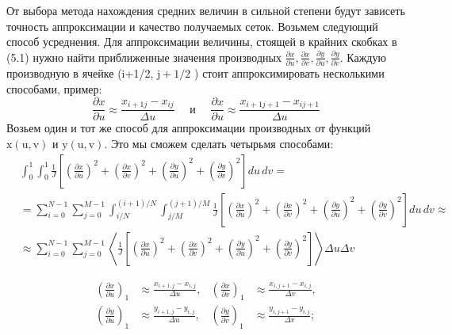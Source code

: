 \documentclass[a4paper,14pt,russian]{extreport}
\renewcommand{\_}{\kern-1.5pt\textunderscore\kern-1.5pt}
\begin{document}
От выбора метода нахождения средних величин в сильной степени будут зависеть точность аппроксимации и качество получаемых сеток. Возьмем следующий способ усреднения. Для аппроксимации величины, стоящей в крайних скобках в (5.1) нужно найти приближенные значения производных $\frac{\partial x}{\partial u}, \frac{\partial x}{\partial v}, \frac{\partial y}{\partial u}, \frac{\partial y}{\partial v}$. Каждую производную в ячейке (i+1/2, $\mathrm{j}+1 / 2$ ) стоит аппроксимировать несколькими способами, пример:
$$
\frac{\partial x}{\partial u} \approx \frac{x_{i+1 j}-x_{i j}}{\Delta u} \quad \text { и } \quad \frac{\partial x}{\partial u} \approx \frac{x_{i+1 j+1}-x_{i j+1}}{\Delta u}
$$
Возьем один и тот же способ для аппроксимации производных от функций $\mathrm{x}(\mathrm{u}, \mathrm{v})$ и $\mathrm{y}(\mathrm{u}, \mathrm{v})$. Это мы сможем сделать четырьмя способами:
\begin{equation}
\begin{aligned}
& \int_0^1 \int_0^1 \frac{1}{J}\left[\left(\frac{\partial x}{\partial u}\right)^2+\left(\frac{\partial x}{\partial v}\right)^2+\left(\frac{\partial y}{\partial u}\right)^2+\left(\frac{\partial y}{\partial v}\right)^2\right] du\, dv = \\
& = \sum_{i=0}^{N-1} \sum_{j=0}^{M-1} \int_{i/N}^{(i+1)/N} \int_{j/M}^{(j+1)/M} \frac{1}{J}\left[\left(\frac{\partial x}{\partial u}\right)^2+\left(\frac{\partial x}{\partial v}\right)^2+\left(\frac{\partial y}{\partial u}\right)^2+\left(\frac{\partial y}{\partial v}\right)^2\right] du\, dv \approx \\
& \approx \sum_{i=0}^{N-1} \sum_{j=0}^{M-1}\left\langle \frac{1}{J}\left[\left(\frac{\partial x}{\partial u}\right)^2+\left(\frac{\partial x}{\partial v}\right)^2+\left(\frac{\partial y}{\partial u}\right)^2+\left(\frac{\partial y}{\partial v}\right)^2\right]\right\rangle \Delta u \Delta v
\end{aligned}
\end{equation}

\begin{align}
\left(\frac{\partial x}{\partial u}\right)_1 &\approx \frac{x_{i+1, j}-x_{i, j}}{\Delta u}, &
\left(\frac{\partial x}{\partial v}\right)_1 &\approx \frac{x_{i, j+1}-x_{i, j}}{\Delta v}, \\
\left(\frac{\partial y}{\partial u}\right)_1 &\approx \frac{y_{i+1, j}-y_{i, j}}{\Delta u}, &
\left(\frac{\partial y}{\partial v}\right)_1 &\approx \frac{y_{i, j+1}-y_{i, j}}{\Delta v};
\end{align}
\end{document}
